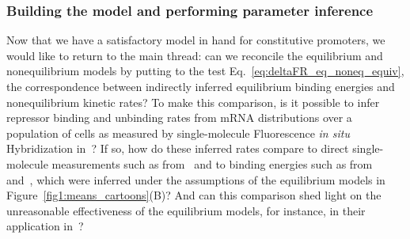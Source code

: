 \subsubsection{Building the model and performing parameter inference}

Now that we have a satisfactory model in hand for constitutive promoters, we
would like to return to the main thread: can we reconcile the equilibrium and
nonequilibrium models by putting to the test
Eq.~\ref{eq:deltaFR_eq_noneq_equiv}, the correspondence between indirectly
inferred equilibrium binding energies and nonequilibrium kinetic rates? To make
this comparison, is it possible to infer repressor binding and unbinding rates
from mRNA distributions over a population of cells as measured by
single-molecule Fluorescence \textit{in situ} Hybridization in~\cite{Jones2014}?
If so, how do these inferred rates compare to direct single-molecule
measurements such as from~\cite{Hammar2014} and to binding energies such as
from~\cite{Garcia2011a} and~\cite{Razo-Mejia2018}, which were inferred under the
assumptions of the equilibrium models in Figure~\ref{fig1:means_cartoons}(B)?
And can this comparison shed light on the unreasonable effectiveness of the
equilibrium models, for instance, in their application in~\cite{Chure2019,
Chure2019a}?


